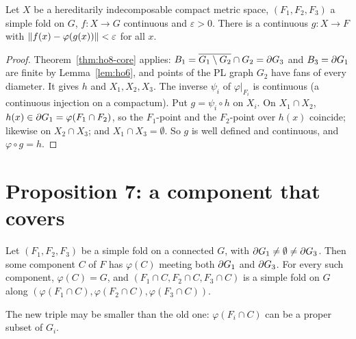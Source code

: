 
\begin{theorem}\label{thm:ho8}
Let $X$ be a hereditarily indecomposable compact metric space, $(F_1,F_2,F_3)$ a simple fold on $G$, $f\colon X\to G$ continuous and $\varepsilon>0$. There is a
continuous $g\colon X\to F$ with $\lVert f(x)-\varphi(g(x))\rVert<\varepsilon$ for all $x$.
\end{theorem}

\begin{proof}
Theorem~\ref{thm:ho8-core} applies: $B_1=\overline{G_1\setminus G_2}\cap G_2=\partial G_3$ and $B_3=\partial G_1$ are finite by Lemma~\ref{lem:ho6}, and points of the PL graph $G_2$ have fans
of every diameter. It gives $h$ and $X_1,X_2,X_3$. The inverse $\psi_i$ of $\varphi|_{F_i}$ is continuous (a continuous injection on a compactum). Put $g=\psi_i\circ h$ on
$X_i$. On $X_1\cap X_2$, $h(x)\in\partial G_1=\varphi(F_1\cap F_2)$, so the $F_1$-point and the $F_2$-point over $h(x)$ coincide; likewise on $X_2\cap X_3$; and $X_1\cap
X_3=\emptyset$. So $g$ is well defined and continuous, and $\varphi\circ g=h$.
\end{proof}


\section{Proposition 7: a component that covers}

\begin{proposition}\label{prop:ho7}
Let $(F_1,F_2,F_3)$ be a simple fold on a connected $G$, with $\partial G_1\neq\emptyset\neq\partial G_3$. Then some component $C$ of $F$ has $\varphi(C)$ meeting both $\partial G_1$ and
$\partial G_3$. For every such component, $\varphi(C)=G$, and $(F_1\cap C,F_2\cap C,F_3\cap C)$ is a simple fold on $G$ along $(\varphi(F_1\cap C),\varphi(F_2\cap C),\varphi(F_3\cap C))$.
\end{proposition}

The new triple may be smaller than the old one: $\varphi(F_i\cap C)$ can be a proper subset of $G_i$.

